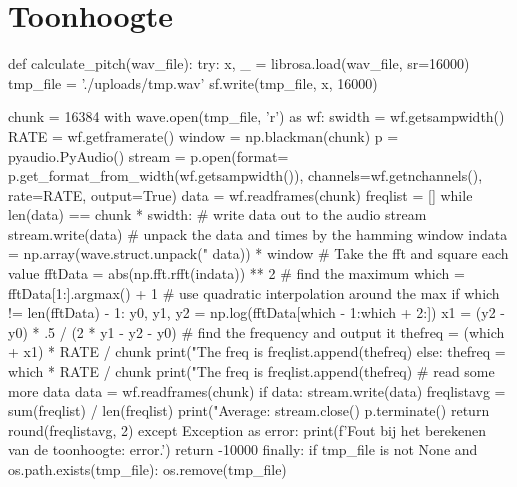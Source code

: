 \section{Toonhoogte}
\begin{python}
def calculate_pitch(wav_file):
    try:
        x, _ = librosa.load(wav_file, sr=16000)
        tmp_file = './uploads/tmp.wav'
        sf.write(tmp_file, x, 16000)

        chunk = 16384
        with wave.open(tmp_file, 'r') as wf:
            swidth = wf.getsampwidth()
            RATE = wf.getframerate()
            window = np.blackman(chunk)
            p = pyaudio.PyAudio()
            stream = p.open(format=
                p.get_format_from_width(wf.getsampwidth()),
                channels=wf.getnchannels(),
                rate=RATE,
                output=True)
            data = wf.readframes(chunk)
            freqlist = []
            while len(data) == chunk * swidth:
                # write data out to the audio stream
                stream.write(data)
                # unpack the data and times by the hamming window
                indata = np.array(wave.struct.unpack("%
                data)) * window
                # Take the fft and square each value
                fftData = abs(np.fft.rfft(indata)) ** 2
                # find the maximum
                which = fftData[1:].argmax() + 1
                # use quadratic interpolation around the max
                if which != len(fftData) - 1:
                    y0, y1, y2 = np.log(fftData[which - 1:which + 2:])
                    x1 = (y2 - y0) * .5 / (2 * y1 - y2 - y0)
                    # find the frequency and output it
                    thefreq = (which + x1) * RATE / chunk
                    print("The freq is %
                    freqlist.append(thefreq)
                else:
                    thefreq = which * RATE / chunk
                    print("The freq is %
                    freqlist.append(thefreq)
                # read some more data
                data = wf.readframes(chunk)
        if data:
            stream.write(data)
        freqlistavg = sum(freqlist) / len(freqlist)
        print("Average: %
        stream.close()
        p.terminate()
        return round(freqlistavg, 2)
    except Exception as error:
        print(f'Fout bij het berekenen van de toonhoogte: {error}.')
        return -10000
    finally:
        if tmp_file is not None and os.path.exists(tmp_file):
            os.remove(tmp_file)
\end{python}

